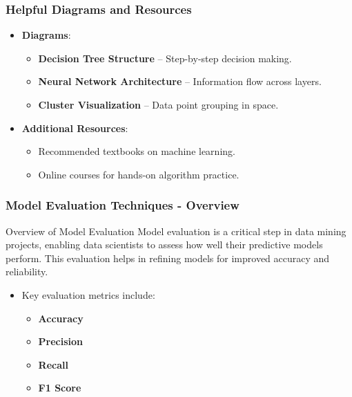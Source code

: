\documentclass[aspectratio=169]{beamer}
\begin{document}
\begin{frame}[fragile]
    \frametitle{Helpful Diagrams and Resources}
    \begin{itemize}
        \item \textbf{Diagrams}:
        \begin{itemize}
            \item \textbf{Decision Tree Structure} – Step-by-step decision making.
            \item \textbf{Neural Network Architecture} – Information flow across layers.
            \item \textbf{Cluster Visualization} – Data point grouping in space.
        \end{itemize}
        \item \textbf{Additional Resources}:
        \begin{itemize}
            \item Recommended textbooks on machine learning.
            \item Online courses for hands-on algorithm practice.
        \end{itemize}
    \end{itemize}
\end{frame}

\begin{frame}[fragile]
    \frametitle{Model Evaluation Techniques - Overview}
    \begin{block}{Overview of Model Evaluation}
        Model evaluation is a critical step in data mining projects, enabling data scientists to assess how well their predictive models perform. This evaluation helps in refining models for improved accuracy and reliability.
    \end{block}
    \begin{itemize}
        \item Key evaluation metrics include:
        \begin{itemize}
            \item \textbf{Accuracy}
            \item \textbf{Precision}
            \item \textbf{Recall}
            \item \textbf{F1 Score}
        \end{itemize}
    \end{itemize}
\end{frame}
\end{document}
